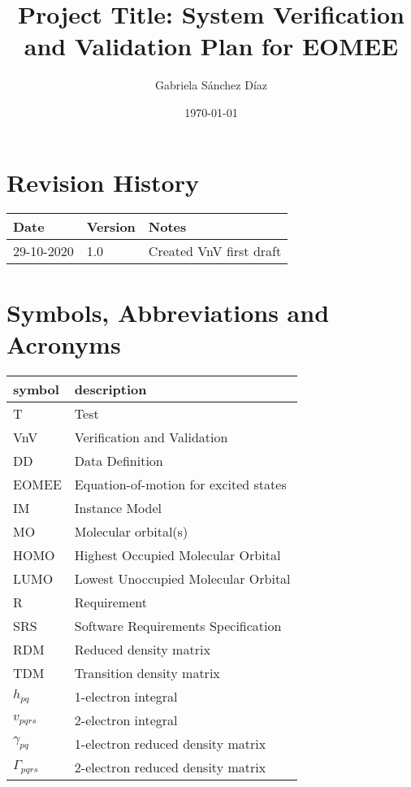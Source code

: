\documentclass[12pt, titlepage]{article}
\begin{document}
\title{Project Title: System Verification and Validation Plan for EOMEE} 
\author{Gabriela S\'anchez D\'iaz}
\date{\today}
	
\maketitle


\section{Revision History}

\begin{tabularx}{\textwidth}{p{3cm}p{2cm}X}
\toprule {\bf Date} & {\bf Version} & {\bf Notes}\\
\midrule
29-10-2020 & 1.0 & Created VnV first draft \\
\bottomrule
\end{tabularx}

\newpage

\tableofcontents

\listoftables

\listoffigures

\newpage

\section{Symbols, Abbreviations and Acronyms}

\renewcommand{\arraystretch}{1.2}
\begin{tabular}{l l} 
  \toprule		
  \textbf{symbol} & \textbf{description}\\
  \midrule 
  T & Test\\
  VnV & Verification and Validation\\
  DD & Data Definition\\
  EOMEE& Equation-of-motion for excited states\\
  IM & Instance Model\\
  MO & Molecular orbital(s)\\
  HOMO& Highest Occupied Molecular Orbital\\
  LUMO& Lowest Unoccupied Molecular Orbital\\
  R & Requirement\\
  SRS & Software Requirements Specification\\
  RDM & Reduced density matrix\\
  TDM & Transition density matrix\\
  $h_{pq}$ & 1-electron integral\\
  $v_{pqrs}$ & 2-electron integral\\
  $\gamma_{pq}$ & 1-electron reduced density matrix\\
  $\Gamma_{pqrs}$ & 2-electron reduced density matrix\\
  \bottomrule
\end{tabular}\\
\end{document}
